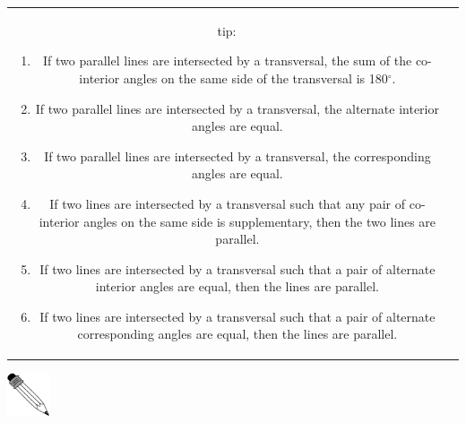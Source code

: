 \begin{table}[H]
\begin{tabular}{cc}
	\begin{minipage}{0.85\textwidth}
	\begin{note}
      {tip: }
        \label{m38380*id317145}\begin{enumerate}[noitemsep,
label=\textbf{\arabic*}. ] 
            \label{m38380*uid31}\item If two parallel lines are intersected by a
transversal, the sum of the co-interior angles on the same side of the
transversal is 180\begin{math}{}^{\circ }\end{math}.
\label{m38380*uid32}\item If two parallel lines are intersected by a
transversal, the alternate interior angles are equal.
\label{m38380*uid33}\item If two parallel lines are intersected by a
transversal, the corresponding angles are equal.
\label{m38380*uid34}\item If two lines are intersected by a transversal such
that any pair of co-interior angles on the same side is supplementary, then the
two lines are parallel.
\label{m38380*uid35}\item If two lines are intersected by a transversal such
that a pair of alternate interior angles are equal, then the lines are parallel.
\label{m38380*uid36}\item If two lines are intersected by a transversal such
that a pair of alternate corresponding angles are equal, then the lines are
parallel.
\end{enumerate}
        

	\end{note}
	\end{minipage}
	\end{tabular}
	\par
      
\par \pagebreak
            \label{m38380*eip-499}\vspace{.5cm} 
      
      \noindent
      \hspace*{-30pt}\includegraphics[width=0.5in]{col11306.imgs/pspencil2.png} 
\end{table}
